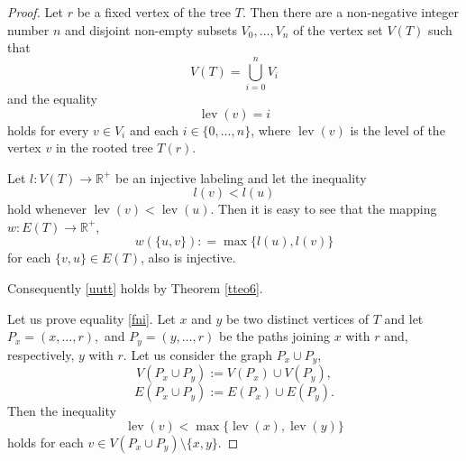 \documentclass[pdflatex,sn-mathphys-num]{sn-jnl}%
\theoremstyle{thmstyleone}%
\theoremstyle{thmstyletwo}%
\theoremstyle{thmstylethree}%
\theoremstyle{thmstyletwo}%
\theoremstyle{thmstylethree}%
\begin{document}
\begin{proof}
Let $r$ be a fixed vertex of the tree $T$. Then there are a non-negative integer number $n$ and disjoint non-empty subsets $V_0,\ldots,V_n$ of the vertex set $V(T)$ such that
\begin{equation}
    \label{r1}
V(T) = \bigcup_{i=0}^{n} V_i
\end{equation}
and the equality
\begin{equation}
    \label{r2}
\operatorname{lev}(v) = i
\end{equation}
holds for every $v \in V_i$ and each $i \in \{0, \ldots, n\}$, where $\operatorname{lev}(v)$ is the level of the vertex $v$ in the rooted tree $T(r)$.


Let
\(
l : V(T) \to \mathbb{R}^+
\)
be an injective labeling and let the inequality
\[
l(v) < l(u)
\]
hold whenever $\operatorname{lev}(v) < \operatorname{lev} (u)$.
Then it is easy to see that the mapping $w : E(T) \to \mathbb{R}^+$,
\[
w(\{u,v\}): = \max\{l(u), l(v)\}
\]
for each $\{v,u\} \in E(T)$, also is injective.

Consequently \eqref{uutt} holds by Theorem \ref{tteo6}.

Let us prove equality \eqref{fni}.
Let $x$ and $y$ be two distinct vertices of $T$ and let
\(
P_x = (x,\dots,r), \) and \(P_y = (y,\dots,r)
\)
be the paths joining $x$ with  $r$ and, respectively, $y$ with $r$. Let us consider the graph $P_x \cup P_y$,
\begin{equation}
    \label{n0}
V(P_x \cup P_y) := V(P_x) \cup V(P_y), 
\end{equation}
\begin{equation}
        \label{n00}
E(P_x \cup P_y) := E(P_x) \cup E(P_y). 
\end{equation}
Then the inequality
\begin{equation}
    \label{n1}
\operatorname{lev}(v) < \max\{\operatorname{lev}(x), \operatorname{lev}(y)\}
\end{equation}
holds for each $v \in V(P_x \cup P_y)\setminus\{x,y\}$.


\end{proof}
\end{document}
